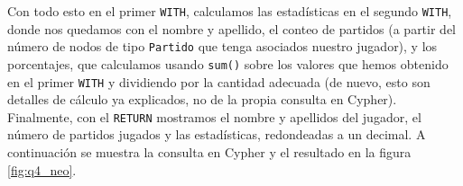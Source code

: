 Con todo esto en el primer \texttt{WITH}, calculamos las estadísticas en el segundo \texttt{WITH}, donde nos quedamos con el nombre y apellido, el conteo de partidos (a partir del número de nodos de tipo \texttt{Partido} que tenga asociados nuestro jugador), y los porcentajes, que calculamos usando \texttt{sum()} sobre los valores que hemos obtenido en el primer \texttt{WITH} y dividiendo por la cantidad adecuada (de nuevo, esto son detalles de cálculo ya explicados, no de la propia consulta en Cypher). \\

Finalmente, con el \texttt{RETURN} mostramos el nombre y apellidos del jugador, el número de partidos jugados y las estadísticas, redondeadas a un decimal. A continuación se muestra la consulta en Cypher y el resultado en la figura \ref{fig:q4_neo}.

